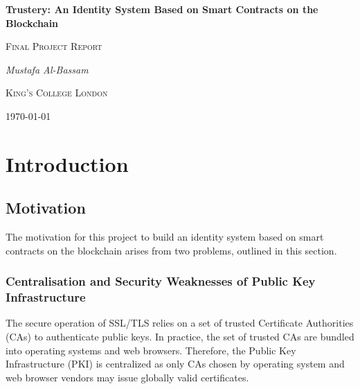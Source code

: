 \documentclass[12pt,a4paper]{report}
\newenvironment{originality}
	{\renewcommand{\abstractname}{Originality Avowal}
		\begin{abstract}}
	{\end{abstract}
		\clearpage}
\newenvironment{acknowledgements}
	{\renewcommand{\abstractname}{Acknowledgements}
		\begin{abstract}}
	{\end{abstract}
		\clearpage}
\begin{document}
	\begin{titlepage}
		\centering
		{\huge\bfseries Trustery: An Identity System Based on Smart Contracts on the Blockchain\par}
		\vspace{1cm}
		{\Large\scshape Final Project Report\par}
		\vspace{1.5cm}
		{\Large\itshape Mustafa Al-Bassam\par}
		\vfill
		{\LARGE\scshape King's College London\par}
		\vfill
		{\large \today\par}
	\end{titlepage}
	
	\begin{abstract}
		test
	\end{abstract}
	
	\begin{acknowledgements}
		test
	\end{acknowledgements}
	
	\begin{originality}
		I verify that I am the sole author of this report, except for the content of this originality avowal and where explicitly stated to the contrary.
		
		I grant King's College London the right to make paper and electronic copies of the submitted work for purposes of marking, plagiarism detection and archival, and to upload a copy of the work to a trusted plagiarism detection service. I confirm this report does not exceed 25,000 words.
		
		\bigskip
		\noindent Mustafa Al-Bassam\newline
		\today
	\end{originality}
	
	\tableofcontents
	
	\chapter{Introduction}
	\section{Motivation}
	The motivation for this project to build an identity system based on smart contracts on the blockchain arises from two problems, outlined in this section.
	
	\subsection{Centralisation and Security Weaknesses of Public Key Infrastructure}
	The secure operation of SSL/TLS relies on a set of trusted Certificate Authorities (CAs) to authenticate public keys\cite{1}. In practice, the set of trusted CAs are bundled into operating systems and web browsers. Therefore, the Public Key Infrastructure (PKI) is centralized as only CAs chosen by operating system and web browser vendors may issue globally valid certificates.
\end{document}
